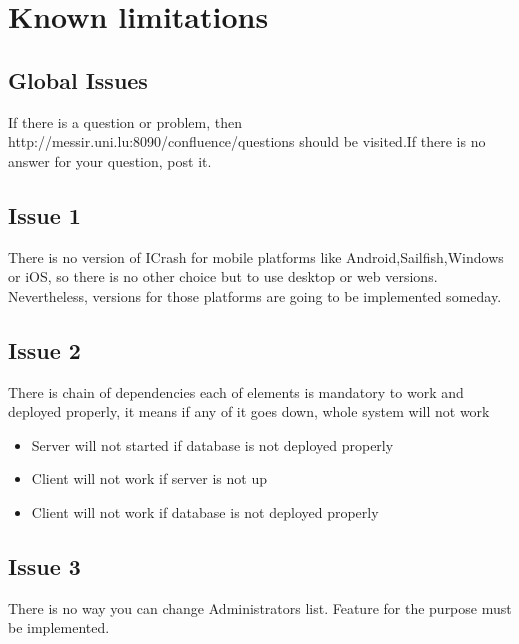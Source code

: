 \chapter{Known limitations}
\label{chap:know_limitations}


\section{Global Issues}
If there is a question or problem, then
http://messir.uni.lu:8090/confluence/questions should be visited.If there is no
answer for your question, post it.

\section{Issue 1}
There is no version of ICrash for mobile platforms like Android,Sailfish,Windows
or iOS, so there is no other choice but to use desktop or web versions.
Nevertheless, versions for those platforms are going to be implemented someday.


\section{Issue 2}
There is chain of dependencies each of elements is mandatory to work and
deployed properly, it means if any of it goes down, whole system will not work

\begin{itemize}					
\item Server will not started if database is not deployed properly 
\item Client will not work if server is not up
\item Client will not work if database is not deployed properly 
\end{itemize}

\section{Issue 3}
There is no way you can change Administrators list. Feature for the purpose
must be implemented.
